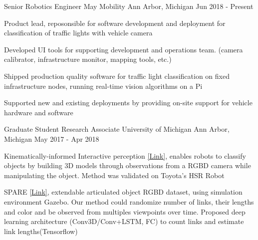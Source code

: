 

\begin{cventries}

  \cventry
    {Senior Robotics Engineer} %
    {May Mobility} %
    {Ann Arbor, Michigan} %
    {Jun 2018 - Present} %
    {
      \begin{cvitems} %
        \item {Product lead, reposonsible for software development and deployment for classification of traffic lights with vehicle camera}
        \item {Developed UI tools for supporting development and operations team. (camera calibrator, infrastructure monitor, mapping tools, etc.)}
        \item {Shipped production quality software for  traffic light classification on fixed infrastructure nodes, running real-time vision algorithms on a Pi}
        \item {Supported new and existing deployments by providing on-site support for vehicle hardware and software}
      \end{cvitems}
    }

  \cventry
    {Graduate Student Research Associate} %
    {University of Michigan} %
    {Ann Arbor, Michigan} %
    {May 2017 - Apr 2018} %
    {
      \begin{cvitems} %
        \item {Kinematically-informed Interactive perception \href{https://arxiv.org/abs/1901.05580}{[Link]}, enables robots to classify objects by building 3D models through observations from a RGBD camera while manipulating the object. Method was validated on Toyota’s HSR Robot}
        \item SPARE {\href{https://arxiv.org/abs/1803.11147}{[Link]}, extendable articulated object RGBD dataset, using simulation environment Gazebo. Our method could randomize number of links, their lengths and color and be observed from multiples viewpoints over time. Proposed deep learning architecture (Conv3D/Conv+LSTM, FC) to count links and estimate link lengths(Tensorflow)}
      \end{cvitems}
    }


\end{cventries}
